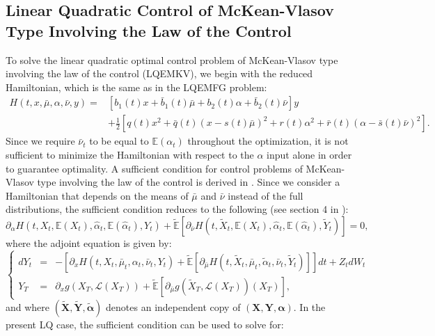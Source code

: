 \documentclass[11pt]{article}
\newcommand\cL{\mathcal L}
\begin{document}
\subsection{\textbf{Linear Quadratic Control of McKean-Vlasov Type Involving the Law of the Control}}\label{sec:EMKV}
To solve the linear quadratic optimal control problem of McKean-Vlasov type involving the law of the control (LQEMKV), we begin with the reduced Hamiltonian, which is the same as in the LQEMFG problem:
\begin{equation*}
\begin{split}
    H(t,x,\bar{\mu},\alpha,\bar{\nu},y)=&\left[b_1(t)x+\bar{b}_1(t)\bar{\mu}+b_2(t) \alpha+\bar{b}_2(t)\bar{\nu}\right]y\\
    &+\frac{1}{2}\left[q(t)x^2+\bar{q}(t)(x-s(t)\bar{\mu})^2 +r(t)\alpha^2+\bar{r}(t)(\alpha-\bar{s}(t)\bar{\nu})^2\right].
\end{split}
\end{equation*}
Since we require $\bar{\nu}_t$ to be equal to $\mathbb{E}(\alpha_t)$ throughout the optimization, it is not sufficient to minimize the Hamiltonian with respect to the $\alpha$ input alone in order to guarantee optimality. A sufficient condition for control problems of McKean-Vlasov type involving the law of the control is derived in \cite{carmona_acciaio}. Since we consider a Hamiltonian that depends on the means of $\bar{\mu}$ and $\bar{\nu}$ instead of the full distributions, the sufficient condition reduces to the following (see section 4 in \cite{carmona_acciaio}):
\begin{equation*}
    \partial_{\alpha}H(t,X_t,\mathbb{E}(X_t),\hat{\alpha}_t,\mathbb{E}(\hat{\alpha}_t),Y_t)+\tilde{\mathbb{E}} \left[\partial_{\bar{\nu}}H(t,\tilde{X}_t,\mathbb{E}(X_t),\hat{\alpha}_t,\mathbb{E}(\hat{\alpha}_t),\tilde{Y}_t) \right]=0,
\end{equation*}
where the adjoint equation is given by:
\begin{equation*}
\left\{
\begin{array}{lcl}
    dY_t&=&-\left[\partial_x H(t,X_t,\bar{\mu}_t,\alpha_t,\bar{\nu}_t,Y_t)+\tilde{\mathbb{E}} \left[\partial_{\bar{\mu}}H(t,\tilde{X}_t,\bar{\mu}_t,\tilde{\alpha}_t,\bar{\nu}_t,\tilde{Y}_t) \right] \right]dt+Z_tdW_t \\[8pt]
    Y_T&=&\partial_xg(X_T, \cL(X_T))+\tilde{\mathbb{E}} \left[\partial_{\bar{\mu}}g(\tilde{X}_T,\cL(X_T))(X_T) \right],
\end{array}
\right.
\end{equation*}
and where $(\boldsymbol{\tilde{X}},\boldsymbol{\tilde{Y}},\boldsymbol{\tilde{\alpha}})$ denotes an independent copy of $(\boldsymbol{X},\boldsymbol{Y},\boldsymbol{\alpha})$. In the present LQ case, the sufficient condition can be used to solve for:
\end{document}
